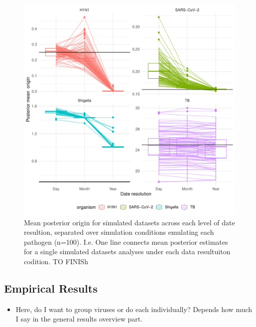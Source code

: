 \documentclass{article}
\begin{document}
\begin{spacing}{1.5}
\begin{figure}[h]
\centering
\includegraphics[width = 1\linewidth]{sim_origin_trajectory}
\caption{Mean posterior origin for simulated datasets across each level of date resultion, separated over simulation conditions emulating each pathogen (n=100). I.e. One line connects mean posterior estimates for a single simulated datasets analyses under each data resultuiton codition. TO FINISh}
\label{simOrigin}
\end{figure}


\subsection*{Empirical Results}
\begin{itemize}
	\item Here, do I want to group viruses or do each individually? Depends how much I say in the general results overview part.
\end{itemize}



\end{spacing}
\end{document}
